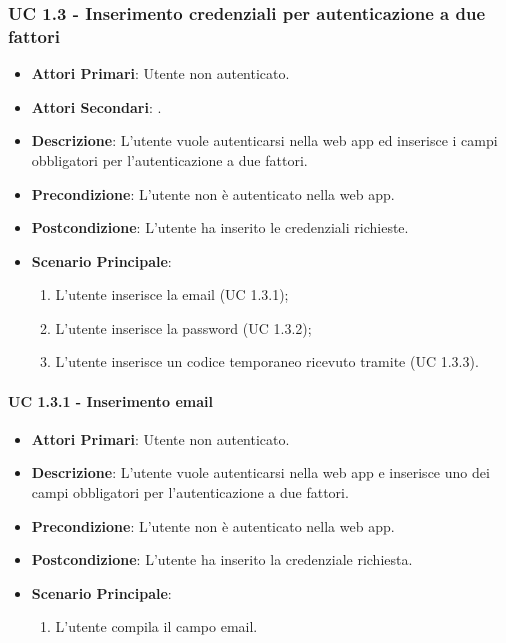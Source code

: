 		\subsubsection{UC 1.3 - Inserimento credenziali per autenticazione a due fattori}
		\begin{itemize}
			\item \textbf{Attori Primari}: Utente non autenticato.
			\item \textbf{Attori Secondari}: .
			\item \textbf{Descrizione}: L'utente vuole autenticarsi nella web app ed inserisce i campi obbligatori per l'autenticazione a due fattori.
			\item \textbf{Precondizione}: L'utente non è autenticato nella web app.
			\item \textbf{Postcondizione}: L'utente ha inserito le credenziali richieste.
			\item \textbf{Scenario Principale}:
			\begin{enumerate}
				\item L'utente inserisce la email (UC 1.3.1);
				\item L'utente inserisce la password (UC 1.3.2);
				\item L'utente inserisce un codice temporaneo ricevuto tramite  (UC 1.3.3).
			\end{enumerate}	
		\end{itemize}

			\paragraph{UC 1.3.1 - Inserimento email}
			\begin{itemize}
				\item \textbf{Attori Primari}: Utente non autenticato.
				\item \textbf{Descrizione}: L'utente vuole autenticarsi nella web app e inserisce uno dei campi obbligatori per l'autenticazione a due fattori.
				\item \textbf{Precondizione}: L'utente non è autenticato nella web app.
				\item \textbf{Postcondizione}: L'utente ha inserito la credenziale richiesta.
				\item \textbf{Scenario Principale}:
				\begin{enumerate}
					\item L'utente compila il campo email.
				\end{enumerate}	
			\end{itemize}

